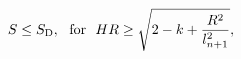 \begin{equation}
\label{2eq16}
S \le S_{\rm D},~~ {\rm for}~~
HR \ge \sqrt {2-k+ \frac{R^2}{l_{n+1}^2}},
\end{equation}

